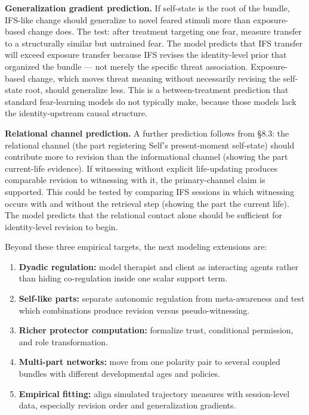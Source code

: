 \documentclass[12pt,a4paper]{article}
\providecommand{\tightlist}{%
  \setlength{\itemsep}{0pt}\setlength{\parskip}{0pt}}
\begin{document}
\textbf{Generalization gradient prediction.} If self-state is the root
of the bundle, IFS-like change should generalize to novel feared stimuli
more than exposure-based change does. The test: after treatment
targeting one fear, measure transfer to a structurally similar but
untrained fear. The model predicts that IFS transfer will exceed
exposure transfer because IFS revises the identity-level prior that
organized the bundle --- not merely the specific threat association.
Exposure-based change, which moves threat meaning without necessarily
revising the self-state root, should generalize less. This is a
between-treatment prediction that standard fear-learning models do not
typically make, because those models lack the identity-upstream causal
structure.

\textbf{Relational channel prediction.} A further prediction follows
from §8.3: the relational channel (the part registering Self's
present-moment self-state) should contribute more to revision than the
informational channel (showing the part current-life evidence). If
witnessing without explicit life-updating produces comparable revision
to witnessing with it, the primary-channel claim is supported. This
could be tested by comparing IFS sessions in which witnessing occurs
with and without the retrieval step (showing the part the current life).
The model predicts that the relational contact alone should be
sufficient for identity-level revision to begin.

Beyond these three empirical targets, the next modeling extensions are:

\begin{enumerate}
\def\labelenumi{\arabic{enumi}.}
\tightlist
\item
  \textbf{Dyadic regulation:} model therapist and client as interacting
  agents rather than hiding co-regulation inside one scalar support
  term.
\item
  \textbf{Self-like parts:} separate autonomic regulation from
  meta-awareness and test which combinations produce revision versus
  pseudo-witnessing.
\item
  \textbf{Richer protector computation:} formalize trust, conditional
  permission, and role transformation.
\item
  \textbf{Multi-part networks:} move from one polarity pair to several
  coupled bundles with different developmental ages and policies.
\item
  \textbf{Empirical fitting:} align simulated trajectory measures with
  session-level data, especially revision order and generalization
  gradients.
\end{enumerate}
\end{document}
